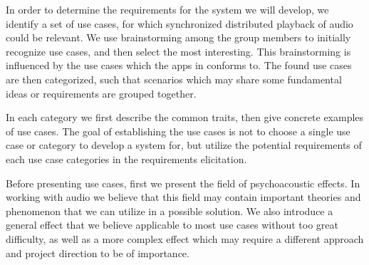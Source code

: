 In order to determine the requirements for the system we will develop, we identify a set of use cases, for which synchronized distributed playback of audio could be relevant.
We use brainstorming among the group members to initially recognize use cases, and then select the most interesting.
This brainstorming is influenced by the use cases which the apps in  conforms to.
The found use cases are then categorized, such that scenarios which may share some fundamental ideas or requirements are grouped together.

In each category we first describe the common traits, then give concrete examples of use cases.
The goal of establishing the use cases is not to choose a single use case or category to develop a system for, but utilize the potential requirements of each use case categories in the requirements elicitation.

Before presenting use cases, first we present the field of psychoacoustic effects.
In working with audio we believe that this field may contain important theories and phenomenon that we can utilize in a possible solution.
We also introduce a general effect that we believe applicable to most use cases without too great difficulty, as well as a more complex effect which may require a different approach and project direction to be of importance.
